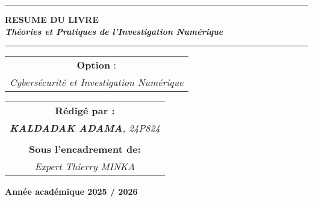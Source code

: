\documentclass[memoire, 12pt]{report}
\begin{document}
\begin{titlepage}
\begin{center}
		\vspace{0.5cm}
		\begin{tabular}{l*{40}{@{\hskip 3.5cm}c@{\hskip5cm}} p{3.5cm} r}
		\end{tabular}
		
		\noindent\rule{\textwidth}{0.7mm}
		\Large{{\textbf{RESUME DU LIVRE}}}\\
		\Large{{\textbf{\textit{Théories et Pratiques de l’Investigation Numérique}}}}
		\noindent\rule{\textwidth}{0.7mm}
	\end{center}
		
	\begin{center}
	\begin{tabular}{c}
		
		\vspace{0.1cm}
		\normalsize
	
	
		\vspace{0.1cm}
		\normalsize\textbf{Option }:\\
		\normalsize				
		\textsl{Cybersécurité et Investigation Numérique}
		
	\end{tabular}
	\end{center}
		
	\begin{center}
		\normalsize %
		\begin{tabular}{c}
			\vspace{0.07cm}
			\hspace{0.02cm} \textbf{\textbf{Rédigé par :}}\\
			\hspace{0.02cm} \textsl{\textbf{KALDADAK ADAMA}, 24P824}\\\\
			\vspace{0.1cm}
			\hspace{0.02cm} \textbf{Sous l'encadrement de:}\\
			\hspace{0.02cm} \textsl{Expert Thierry MINKA}\\
				
               
		\end{tabular}
	\end{center}
    
	\vspace{4cm}
	\begin{center}
		\textbf{Année académique 2025 / 2026}
	\end{center}
		
	\vspace{-1.4cm}
	
		
	\vfill%
	
\end{titlepage}

\newpage
\end{document}

